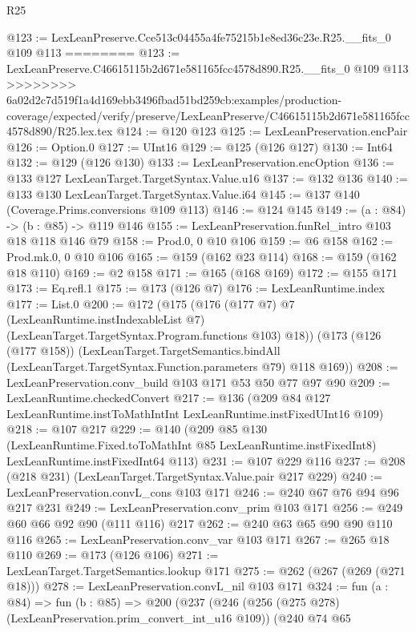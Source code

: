 \begin{lexlean}{R25}
\begin{coremodule}
{{{{{@123 := LexLeanPreserve.Cce513c04455a4fe75215b1e8ed36c23e.R25.__fits_0 @109 @113
========
@123 := LexLeanPreserve.C46615115b2d671e581165fcc4578d890.R25.__fits_0 @109 @113
>>>>>>>> 6a02d2c7d519f1a4d169ebb3496fbad51bd259cb:examples/production-coverage/expected/verify/preserve/LexLeanPreserve/C46615115b2d671e581165fcc4578d890/R25.lex.tex
@124 := @120 @123
@125 := LexLeanPreservation.encPair
@126 := Option.{0}
@127 := UInt16
@129 := @125 (@126 @127)
@130 := Int64
@132 := @129 (@126 @130)
@133 := LexLeanPreservation.encOption
@136 := @133 @127 LexLeanTarget.TargetSyntax.Value.u16
@137 := @132 @136
@140 := @133 @130 LexLeanTarget.TargetSyntax.Value.i64
@145 := @137 @140 (Coverage.Prims.conversions @109 @113)
@146 := @124 @145
@149 := (a : @84) -> (b : @85) -> @119 @146
@155 := LexLeanPreservation.funRel_intro @103 @18 @118 @146 @79
@158 := Prod.{0, 0} @10 @106
@159 := @6 @158
@162 := Prod.mk.{0, 0} @10 @106
@165 := @159 (@162 @23 @114)
@168 := @159 (@162 @18 @110)
@169 := @2 @158
@171 := @165 (@168 @169)
@172 := @155 @171
@173 := Eq.refl.{1}
@175 := @173 (@126 @7)
@176 := LexLeanRuntime.index
@177 := List.{0}
@200 := @172
    (@175
      (@176
        (@177 @7)
        @7
        (LexLeanRuntime.instIndexableList @7)
        (LexLeanTarget.TargetSyntax.Program.functions @103)
        @18))
    (@173
      (@126 (@177 @158))
      (LexLeanTarget.TargetSemantics.bindAll
        (LexLeanTarget.TargetSyntax.Function.parameters @79)
        @118
        @169))
@208 := LexLeanPreservation.conv_build @103 @171 @53 @50 @77 @97 @90
@209 := LexLeanRuntime.checkedConvert
@217 := @136 (@209 @84 @127 LexLeanRuntime.instToMathIntInt LexLeanRuntime.instFixedUInt16 @109)
@218 := @107 @217
@229 := @140
    (@209
      @85
      @130
      (LexLeanRuntime.Fixed.toToMathInt @85 LexLeanRuntime.instFixedInt8)
      LexLeanRuntime.instFixedInt64
      @113)
@231 := @107 @229 @116
@237 := @208 (@218 @231) (LexLeanTarget.TargetSyntax.Value.pair @217 @229)
@240 := LexLeanPreservation.convL_cons @103 @171
@246 := @240 @67 @76 @94 @96 @217 @231
@249 := LexLeanPreservation.conv_prim @103 @171
@256 := @249 @60 @66 @92 @90 (@111 @116) @217
@262 := @240 @63 @65 @90 @90 @110 @116
@265 := LexLeanPreservation.conv_var @103 @171
@267 := @265 @18 @110
@269 := @173 (@126 @106)
@271 := LexLeanTarget.TargetSemantics.lookup @171
@275 := @262 (@267 (@269 (@271 @18)))
@278 := LexLeanPreservation.convL_nil @103 @171
@324 := fun (a : @84) =>
  fun (b : @85) =>
  @200
    (@237
      (@246
        (@256 (@275 @278) (LexLeanPreservation.prim_convert_int_u16 @109))
        (@240
          @74
          @65
}}}}}
\end{coremodule}
\end{lexlean}
